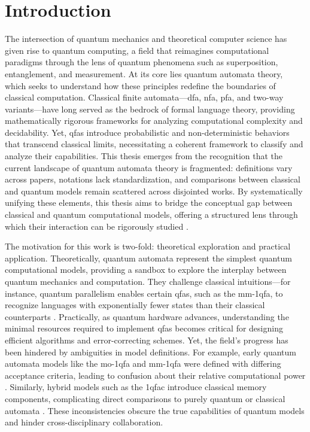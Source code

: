 \chapter{Introduction}  

The intersection of quantum mechanics and theoretical computer science has given rise to quantum computing, a field that reimagines computational paradigms through the lens of quantum phenomena such as superposition, entanglement, and measurement. At its core lies quantum automata theory, which seeks to understand how these principles redefine the boundaries of classical computation. Classical finite automata—\gls{dfa}, \gls{nfa}, \gls{pfa}, and two-way variants—have long served as the bedrock of formal language theory, providing mathematically rigorous frameworks for analyzing computational complexity and decidability. Yet, \glspl{qfa} introduce probabilistic and non-deterministic behaviors that transcend classical limits, necessitating a coherent framework to classify and analyze their capabilities. This thesis emerges from the recognition that the current landscape of quantum automata theory is fragmented: definitions vary across papers, notations lack standardization, and comparisons between classical and quantum models remain scattered across disjointed works. By systematically unifying these elements, this thesis aims to bridge the conceptual gap between classical and quantum computational models, offering a structured lens through which their interaction can be rigorously studied \cite{ambainis2009superiority}.  

The motivation for this work is two-fold: theoretical exploration and practical application. Theoretically, quantum automata represent the simplest quantum computational models, providing a sandbox to explore the interplay between quantum mechanics and computation. They challenge classical intuitions—for instance, quantum parallelism enables certain \glspl{qfa}, such as the \gls{mm-1qfa}, to recognize languages with exponentially fewer states than their classical counterparts \cite{moore2000quantum}. Practically, as quantum hardware advances, understanding the minimal resources required to implement \glspl{qfa} becomes critical for designing efficient algorithms and error-correcting schemes. Yet, the field’s progress has been hindered by ambiguities in model definitions. For example, early quantum automata models like the \gls{mo-1qfa} and \gls{mm-1qfa} were defined with differing acceptance criteria, leading to confusion about their relative computational power \cite{kondacs1997power}. Similarly, hybrid models such as the \gls{1qfac} introduce classical memory components, complicating direct comparisons to purely quantum or classical automata \cite{zheng2012one}. These inconsistencies obscure the true capabilities of quantum models and hinder cross-disciplinary collaboration.  

